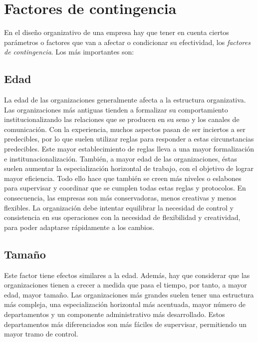 \documentclass[12pt,a4paper,spanish]{report}
\begin{document}
	\section{\textcolor[rgb]{0.5,0.1,0.4}Factores de contingencia}
		En el diseño organizativo de una empresa hay que tener en cuenta ciertos parámetros o factores que van a afectar o condicionar su efectividad, los \textcolor[rgb]{0.5,0.1,0.4}{\emph{factores de contingencia}}. Los más importantes son:
		\subsection*{\textcolor[rgb]{0.5,0.1,0.4}Edad}
			La edad de las organizaciones generalmente afecta a la estructura organizativa. Las organizaciones más antiguas tienden a formalizar su comportamiento institucionalizando las relaciones que se producen en su seno y los canales de comunicación. Con la experiencia, muchos aspectos pasan de ser inciertos a ser predecibles, por lo que suelen utilizar reglas para responder a estas circunstancias predecibles. Este mayor establecimiento de reglas lleva a una mayor formalización e institunacionalización. También, a mayor edad de las organizaciones, éstas suelen aumentar la especialización horizontal de trabajo, con el objetivo de lograr mayor eficiencia. Todo ello hace que también se creen más niveles o eslabones para supervisar y coordinar que se cumplen todas estas reglas y protocolos. En consecuencia, las empresas son más conservadoras, menos creativas y menos flexibles. La organización debe intentar equilibrar la necesidad de control y consistencia en sus operaciones con la necesidad de flexibilidad y creatividad, para poder adaptarse rápidamente a los cambios.

		\subsection*{\textcolor[rgb]{0.5,0.1,0.4}Tamaño}
			Este factor tiene efectos similares a la edad. Además, hay que considerar que las organizaciones tienen a crecer a medida que pasa el tiempo, por tanto, a mayor edad, mayor tamaño. Las organizaciones más grandes suelen tener una estructura más compleja, una especialización horizontal más acentuada, mayor número de departamentos y un componente administrativo más desarrollado. Estos departamentos más diferenciados son más fáciles de supervisar, permitiendo un mayor tramo de control.
\end{document}
